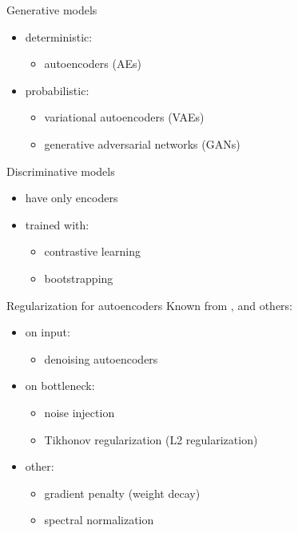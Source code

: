 \documentclass{beamer}
\begin{document}
\begin{frame}{Generative models}
		\begin{itemize}
				\item deterministic:
						\begin{itemize}
								\item autoencoders (AEs)
						\end{itemize}
				\item probabilistic:
						\begin{itemize}
								\item variational autoencoders (VAEs)
								\item generative adversarial networks (GANs)
						\end{itemize}
		\end{itemize}
\end{frame}

\begin{frame}{Discriminative models}
		\begin{itemize}
				\item have only encoders
				\item trained with:
						\begin{itemize}
								\item contrastive learning
								\item bootstrapping
						\end{itemize}
		\end{itemize}
\end{frame}


\begin{frame}{Regularization for autoencoders}
		Known from \cite{bengio2013representation}, \cite{ghosh2019variational} and others:
		\begin{itemize}
				\item on input: 
						\begin{itemize}
								\item denoising autoencoders
						\end{itemize}
				\item on bottleneck:
						\begin{itemize}
								\item noise injection
								\item Tikhonov regularization (L2 regularization)
						\end{itemize}
				\item other:
						\begin{itemize}
								\item gradient penalty (weight decay)
								\item spectral normalization
						\end{itemize}
		\end{itemize}
\end{frame}
\end{document}
